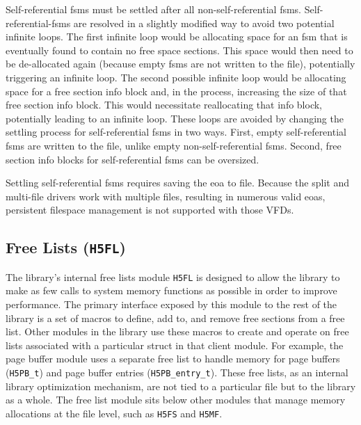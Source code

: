\begin{itemize}
Self-referential \Glspl{fsm} must be settled after all non-self-referential \Glspl{fsm}. Self-referential-\Glspl{fsm} are resolved in a slightly modified way to avoid two potential infinite loops. The first infinite loop would be allocating space for an \Gls{fsm} that is eventually found to contain no free space sections. This space would then need to be de-allocated again (because empty \Glspl{fsm} are not written to the file), potentially triggering an infinite loop. The second possible infinite loop would be allocating space for a free section info block and, in the process, increasing the size of that free section info block. This would necessitate reallocating that info block, potentially leading to an infinite loop. These loops are avoided by changing the settling process for self-referential \Glspl{fsm} in two ways. First, empty self-referential \Glspl{fsm} are written to the file, unlike empty non-self-referential \Glspl{fsm}. Second, free section info blocks for self-referential \Glspl{fsm} can be oversized.

Settling self-referential \Glspl{fsm} requires saving the \gls{eoa} to file. Because the split and multi-file drivers work with multiple files, resulting in numerous valid \glspl{eoa}, persistent filespace management is not supported with those VFDs. 

\end{itemize}

\subsection{Free Lists (\texttt{H5FL})}



The library's internal free lists module \texttt{H5FL} is designed to allow the library to make as few calls to system memory functions as possible in order to improve performance. The primary interface exposed by this module to the rest of the library is a set of macros to define, add to, and remove free sections from a free list. Other modules in the library use these macros to create and operate on free lists associated with a particular struct in that client module. For example, the page buffer module uses a separate free list to handle memory for page buffers (\texttt{H5PB\_t}) and page buffer entries (\texttt{H5PB\_entry\_t}). These free lists, as an internal library optimization mechanism, are not tied to a particular file but to the library as a whole. The free list module sits below other modules that manage memory allocations at the file level, such as \texttt{H5FS} and \texttt{H5MF}.

